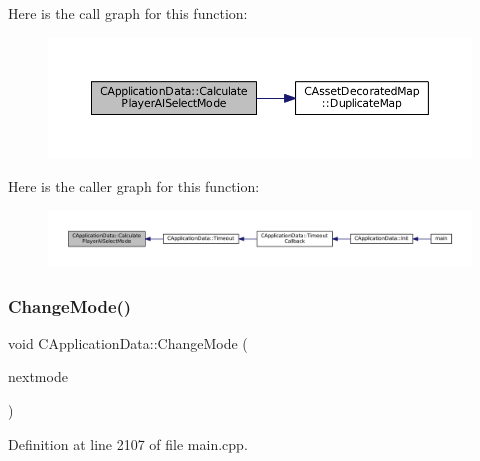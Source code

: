 Here is the call graph for this function\+:
\nopagebreak
\begin{figure}[H]
\begin{center}
\leavevmode
\includegraphics[width=350pt]{classCApplicationData_afbd3d397ba6bb36452458cf8f62ef9dc_cgraph}
\end{center}
\end{figure}
Here is the caller graph for this function\+:
\nopagebreak
\begin{figure}[H]
\begin{center}
\leavevmode
\includegraphics[width=350pt]{classCApplicationData_afbd3d397ba6bb36452458cf8f62ef9dc_icgraph}
\end{center}
\end{figure}
\hypertarget{classCApplicationData_aee18c113e9a0acb3cad3d63eb19de71b}{}\label{classCApplicationData_aee18c113e9a0acb3cad3d63eb19de71b} 
\subsubsection{\texorpdfstring{Change\+Mode()}{ChangeMode()}}
{\footnotesize\ttfamily void C\+Application\+Data\+::\+Change\+Mode (\begin{DoxyParamCaption}\item[{\hyperlink{classCApplicationData_ac8ac37a4c8bb871036fbbdc6a072e403}{E\+Game\+Mode}}]{nextmode }\end{DoxyParamCaption})\hspace{0.3cm}{\ttfamily [protected]}}



Definition at line 2107 of file main.\+cpp.


